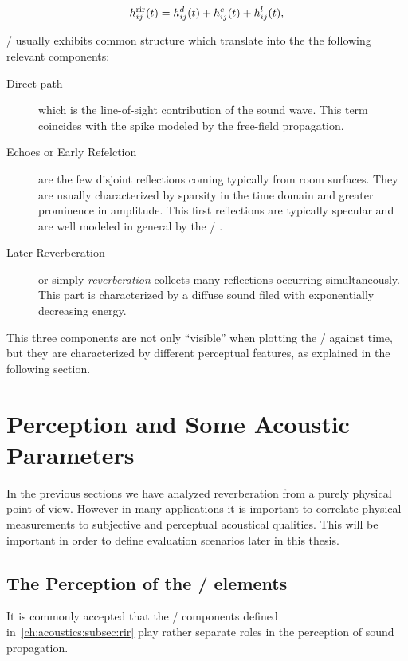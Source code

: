 \begin{equation}\label{eq:acoustics:rir_full}
    h^{\text{rir}}_{ij}(t) = h^d_{ij}(t) + h^e_{ij}(t) + h^l_{ij}(t)
    ,
\end{equation}

\RIRs/ usually exhibits common structure which translate into the the following relevant components:

\begin{description}
    \item[Direct path] which is the line-of-sight contribution of the sound wave.
    This term coincides with the spike modeled by the free-field propagation.
    \item[Echoes or Early Refelction] are the few disjoint reflections coming typically from room surfaces.
    They are usually characterized by sparsity in the time domain and greater prominence in amplitude.
    This first reflections are typically specular and are well modeled in general by the \ISM/ \cite{savioja2015overview}.
    \item[Later Reverberation] or simply \textit{reverberation} collects many reflections occurring simultaneously.
    This part is characterized by a diffuse sound filed with exponentially decreasing energy.
\end{description}

This three components are not only ``visible'' when plotting the \RIR/ against time,
but they are characterized by different perceptual features, as explained in the following section.

\section{Perception and Some Acoustic Parameters}\label{ch:acoustics:sec:perception}
In the previous sections we have analyzed reverberation from a purely physical point of view.
However in many applications it is important to correlate physical measurements to subjective and perceptual acoustical qualities.
This will be important in order to define evaluation scenarios later in this thesis.
\subsection{The Perception of the \RIR/ elements}
It is commonly accepted that the \RIR/ components defined in~\cref{ch:acoustics:subsec:rir} play rather separate roles in the perception of sound propagation.

